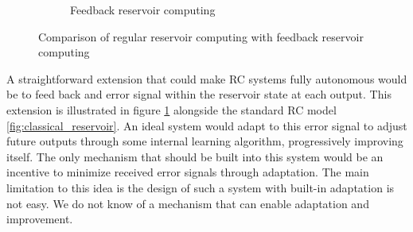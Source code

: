 \begin{figure}[htbp]
\begin{subfigure}[t]{.45\linewidth}
    \caption{Feedback reservoir computing}
    \label{fig:feedback_reservoir}
  \end{subfigure}
  \caption{Comparison of regular reservoir computing with feedback reservoir computing}
  \label{"waiting for reftex-label call..."}
\end{figure}

A straightforward extension that could make \ac{RC} systems fully autonomous
would be to feed back and error signal within the reservoir state at each
output. This extension is illustrated in figure \ref{fig:feedback_reservoir}
alongside the standard \ac{RC} model \ref{fig:classical_reservoir}. An ideal
system would adapt to this error signal to adjust future outputs through some
internal learning algorithm, progressively improving itself. The only mechanism
that should be built into this system would be an incentive to minimize received
error signals through adaptation. The main limitation to this idea is the design
of such a system with built-in adaptation is not easy. We do not know of a
mechanism that can enable adaptation and improvement.
